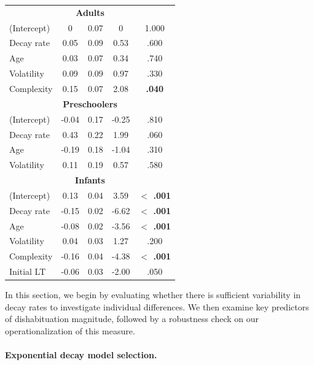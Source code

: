\documentclass[10pt, letterpaper]{article}
\begin{document}
\begin{table}[t]
\begin{minipage}{0.48\textwidth}
\begin{tabular}{@{}lcccc@{}}
            \midrule
            \multicolumn{5}{c}{\textbf{Adults}} \\
            (Intercept) & 0 & 0.07 & 0 & 1.000 \\
           Decay rate  & 0.05 & 0.09 & 0.53 & .600 \\
            Age & 0.03 & 0.07 & 0.34 & .740 \\
            Volatility & 0.09 & 0.09 & 0.97 & .330 \\
            Complexity & 0.15 & 0.07 & 2.08 & \textbf{.040} \\
            \midrule
            \multicolumn{5}{c}{\textbf{Preschoolers}} \\
            (Intercept) & -0.04 & 0.17 & -0.25 & .810 \\
           Decay rate  & 0.43 & 0.22 & 1.99 & .060 \\
            Age & -0.19 & 0.18 & -1.04 & .310 \\
            Volatility & 0.11 & 0.19 & 0.57 & .580 \\
            \midrule
            \multicolumn{5}{c}{\textbf{Infants}} \\
            (Intercept) & 0.13 & 0.04 & 3.59 & \textbf{$<$ .001} \\
           Decay rate  & -0.15 & 0.02 & -6.62 & \textbf{$<$ .001} \\
            Age & -0.08 & 0.02 & -3.56 & \textbf{$<$ .001} \\
            Volatility & 0.04 & 0.03 & 1.27 & .200 \\
            Complexity & -0.16 & 0.04 & -4.38 & \textbf{$<$ .001} \\
            Initial LT & -0.06 & 0.03 & -2.00 & .050 \\
            \bottomrule
        \end{tabular}
    \end{minipage}
\end{table}

In this section, we begin by evaluating whether there is sufficient
variability in decay rates to investigate individual differences. We
then examine key predictors of dishabituation magnitude, followed by a
robustness check on our operationalization of this measure.

\hypertarget{exponential-decay-model-selection.}{%
\paragraph{Exponential decay model
selection.}\label{exponential-decay-model-selection.}}
\end{document}
